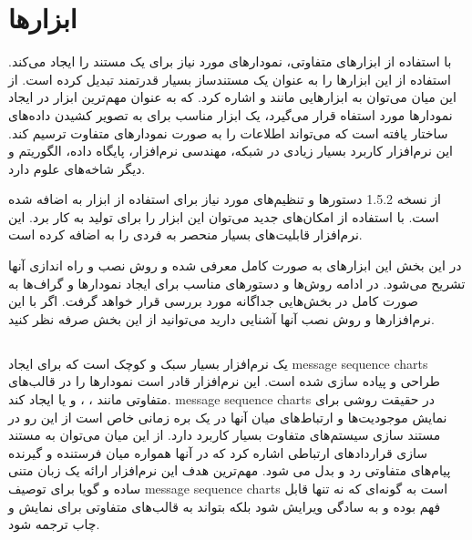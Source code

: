 %
% 
% 
% 
%

\section{ابزارها} 

 با استفاده از ابزارهای متفاوتی، نمودارهای مورد نیاز برای یک مستند
را ایجاد می‌کند. استفاده از این ابزارها  را به عنوان یک مستندساز
بسیار قدرتمند تبدیل کرده است. از این میان می‌توان به ابزارهایی مانند
 و  اشاره کرد.  که به عنوان مهم‌ترین ابزار
در ایجاد نمودارها مورد استفاه قرار می‌گیرد، یک ابزار مناسب برای به تصویر کشیدن
داده‌های ساختار یافته است که می‌تواند اطلاعات را به صورت نمودارهای متفاوت ترسیم
کند. این نرم‌افزار کاربرد بسیار زیادی در شبکه، مهندسی نرم‌افزار، پایگاه داده،
الگوریتم و دیگر شاخه‌های علوم دارد.

از نسخه 1.5.2 دستورها و تنظیم‌های مورد نیاز برای استفاده از ابزار  به
 اضافه شده است. با استفاده از امکان‌های جدید می‌توان این ابزار را
برای تولید  به کار برد. این نرم‌افزار قابلیت‌های
بسیار منحصر به فردی را به  اضافه کرده است.

در این بخش این ابزارهای به صورت کامل معرفی شده و روش نصب و راه اندازی آنها تشریح
می‌شود. در ادامه روش‌ها و دستورهای مناسب برای ایجاد نمودارها و 
گراف‌ها به صورت کامل در بخش‌هایی جداگانه مورد بررسی قرار خواهد گرفت. اگر با این
نرم‌افزارها و روش نصب آنها آشنایی دارید می‌توانید از این بخش صرفه نظر کنید.

\subsection{}

 یک نرم‌افزار بسیار سبک و کوچک است که برای ایجاد 
\glspl{message sequence chart} طراحی و پیاده سازی شده است. این نرم‌افزار قادر
است نمودارها را در قالب‌های متفاوتی مانند ، ، و یا 
ایجاد کند.
\glspl{message sequence chart} در حقیقت روشی برای نمایش موجودیت‌ها و ارتباط‌های
میان آنها در یک بره زمانی خاص است از این رو در مستند سازی سیستم‌های متفاوت 
بسیار کاربرد دارد. از این میان می‌توان به مستند سازی قراردادهای ارتباطی اشاره
کرد که در آنها همواره میان فرستنده و گیرنده پیام‌های متفاوتی رد و بدل می شود.
مهم‌ترین هدف این نرم‌افزار ارائه یک زبان متنی ساده و گویا برای توصیف
\glspl{message sequence chart} است به گونه‌ای که نه تنها قابل فهم بوده و به
سادگی ویرایش شود بلکه بتواند به قالب‌های متفاوتی برای نمایش و چاب ترجمه شود.



